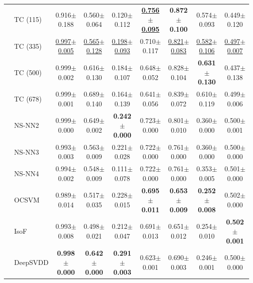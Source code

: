 \documentclass{article}
\begin{document}
\begin{table}[h]
\begin{adjustbox}{width=\textwidth}
\begin{tabular}{cl|ccccccc}
        &TC (115) & 0.916$\pm$0.188 & 0.560$\pm$0.064 & 0.120$\pm$0.112 & \underline{\bf{0.756$\pm$0.095}} & \bf{0.872$\pm$0.100} & 0.574$\pm$0.093 & 0.449$\pm$0.120 \\
        &TC (335) & \underline{0.997$\pm$0.005} & \underline{0.565$\pm$0.128} & \underline{0.198$\pm$0.093} & 0.710$\pm$0.117 & \underline{0.821$\pm$0.083} & \underline{0.582$\pm$0.106} & \underline{0.497$\pm$0.007} \\
        &TC (500) & 0.999$\pm$0.002 & 0.616$\pm$0.130 & 0.184$\pm$0.107 & 0.648$\pm$0.052 & 0.828$\pm$0.104 & \bf{0.631$\pm$0.130} & 0.437$\pm$0.138 \\
        &TC (678) & 0.999$\pm$0.001 & 0.689$\pm$0.140 & 0.164$\pm$0.139 & 0.641$\pm$0.056 & 0.839$\pm$0.072 & 0.610$\pm$0.119 & 0.499$\pm$0.006 \\
        \cmidrule{2-9}
        &NS-NN2 & 0.999$\pm$0.000 & 0.649$\pm$0.002 & \bf{0.242$\pm$0.000} & 0.723$\pm$0.000 & 0.801$\pm$0.010 & 0.360$\pm$0.000 & 0.500$\pm$0.001 \\
        &NS-NN3 & 0.993$\pm$0.003 & 0.563$\pm$0.009 & 0.221$\pm$0.028 & 0.722$\pm$0.000 & 0.761$\pm$0.000 & 0.360$\pm$0.000 & 0.500$\pm$0.000 \\
        &NS-NN4 & 0.994$\pm$0.002 & 0.548$\pm$0.009 & 0.111$\pm$0.078 & 0.722$\pm$0.000 & 0.761$\pm$0.000 & 0.353$\pm$0.005 & 0.501$\pm$0.000 \\
        \midrule
        \parbox[t]{2mm}{} & OCSVM & 0.989$\pm$0.014 & 0.517$\pm$0.035 & 0.228$\pm$0.015 & \bf{0.695$\pm$0.011} & \textbf{0.653$\pm$0.009} & \textbf{0.252$\pm$0.008} & 0.502$\pm$0.000 \\
        &IsoF & 0.993$\pm$0.008 & 0.498$\pm$0.021 & 0.212$\pm$0.047 & 0.691$\pm$0.013& 0.651$\pm$0.012 & 0.254$\pm$0.010 & \textbf{0.502$\pm$0.001} \\
        &DeepSVDD & \bf{0.998$\pm$0.000} & \textbf{0.642$\pm$0.000} & \bf{0.291$\pm$0.003} & {0.623$\pm$0.001} & 0.690$\pm$0.003 & 0.246$\pm$0.001 & {0.500$\pm$0.000} \\
         \bottomrule
        \end{tabular}
  \end{adjustbox}
    \label{tab:kitsune_full}
\end{table}
\end{document}
